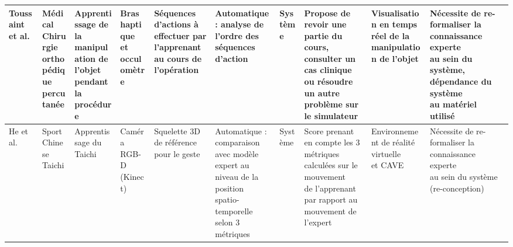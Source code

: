 \begin{landscape}
\begin{table}[]
{\begin{tabular}{|l|l|l|l|l|l|l|l|l|l|}
Toussaint et al. & \makecell[l]{Médical\\Chirurgie\\orthopédique\\percutanée} & \makecell[l]{Apprentissage de la\\manipulation de l'objet\\pendant la procédure} & \makecell[l]{Bras haptique\\et occulomètre} & \makecell[l]{Séquences d'actions à effectuer par\\ l'apprenant au cours de l'opération} & \makecell[l]{Automatique : analyse de l'ordre des\\séquences d'action} & Système & \makecell[l]{Propose de revoir une partie du cours,\\consulter un cas clinique ou résoudre\\un autre problème sur le simulateur} & \makecell[l]{Visualisation en temps réel de la\\ manipulation de l'objet} & \makecell[l]{Nécessite de re-formaliser la connaissance experte\\au sein du système, dépendance du système\\au matériel utilisé} \\ \hline

He et al. & \makecell[l]{Sport\\Chinese Taichi} & Apprentissage du Taichi & \makecell[l]{Caméra RGB-D\\(Kinect)} & Squelette 3D de référence pour le geste & \makecell[l]{Automatique : comparaison avec modèle\\expert au niveau de la position\\spatio-temporelle selon 3 métriques} & Système & \makecell[l]{Score prenant en compte les 3\\métriques calculées sur le mouvement\\de l'apprenant par rapport au\\mouvement de l'expert} & \makecell[l]{Environnement de réalité virtuelle\\et CAVE} & \makecell[l]{Nécessite de re-formaliser la connaissance experte\\au sein du système (re-conception)} \\ \hline


\end{tabular}}
\end{table}
\end{landscape}
